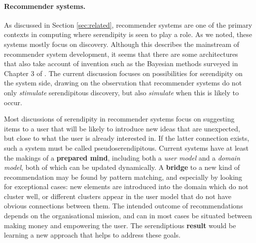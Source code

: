 \paragraph{Recommender systems.} 
As discussed in Section \ref{sec:related}, recommender systems are one
of the primary contexts in computing where serendipity is seen to play
a role.  As we noted, these systems mostly focus on discovery.
Although this describes the mainstream of recommender system
development, it seems that there are some architectures that also take
account of invention such as the Bayesian methods surveyed in
Chapter 3 of .  The current discussion
focuses on possibilities for serendipity on the system side, drawing
on the observation that recommender systems do not only \emph{stimulate}
serendipitous discovery, but also \emph{simulate}
when this is likely to occur.

Most discussions of serendipity in recommender systems focus on suggesting items to a user that will be likely to introduce new ideas that are unexpected, but close to what the user is already interested in. If the latter connection exists, such a system must be called pseudoserendipitous. Current systems have at least the makings of a \textbf{prepared mind}, including both a \emph{user model} and a \emph{domain model}, both of which can be updated dynamically.  A \textbf{bridge} to a new kind of recommendation may be found by pattern matching, and especially by looking for exceptional cases: new elements are introduced into the domain which do not cluster well, or different clusters appear in the user model that do not have obvious connections between them.  The intended outcome of recommendations depends on the organisational mission, and can in most cases be situated between making money and empowering the user. The serendiptious \textbf{result} would be learning a new approach that helps to address these goals.

